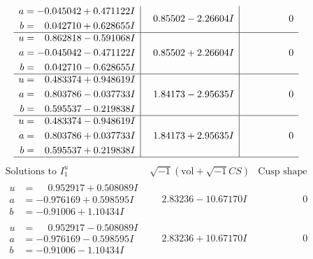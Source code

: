\documentclass[1p]{elsarticle_modified}
\theoremstyle{definition}
\newcommand{\I}{\sqrt{-1}}
\begin{document}
$$\begin{array}{c|c|c}
\begin{aligned}
a &= -0.045042 + 0.471122 I \\
b &= \phantom{-}0.042710 + 0.628655 I\end{aligned}
 & \phantom{-}0.85502 - 2.26604 I & \phantom{-0.000000 } 0 \\ \hline\begin{aligned}
u &= \phantom{-}0.862818 - 0.591068 I \\
a &= -0.045042 - 0.471122 I \\
b &= \phantom{-}0.042710 - 0.628655 I\end{aligned}
 & \phantom{-}0.85502 + 2.26604 I & \phantom{-0.000000 } 0 \\ \hline\begin{aligned}
u &= \phantom{-}0.483374 + 0.948619 I \\
a &= \phantom{-}0.803786 - 0.037733 I \\
b &= \phantom{-}0.595537 - 0.219838 I\end{aligned}
 & \phantom{-}1.84173 - 2.95635 I & \phantom{-0.000000 } 0 \\ \hline\begin{aligned}
u &= \phantom{-}0.483374 - 0.948619 I \\
a &= \phantom{-}0.803786 + 0.037733 I \\
b &= \phantom{-}0.595537 + 0.219838 I\end{aligned}
 & \phantom{-}1.84173 + 2.95635 I & \phantom{-0.000000 } 0\\
 \hline 
 \end{array}$$\newpage$$\begin{array}{c|c|c}  
\text{Solutions to }I^u_{1}& \I (\text{vol} + \sqrt{-1}CS) & \text{Cusp shape}\\
 \hline 
\begin{aligned}
u &= \phantom{-}0.952917 + 0.508089 I \\
a &= -0.976169 + 0.598595 I \\
b &= -0.91006 + 1.10434 I\end{aligned}
 & \phantom{-}2.83236 - 10.67170 I & \phantom{-0.000000 } 0 \\ \hline\begin{aligned}
u &= \phantom{-}0.952917 - 0.508089 I \\
a &= -0.976169 - 0.598595 I \\
b &= -0.91006 - 1.10434 I\end{aligned}
 & \phantom{-}2.83236 + 10.67170 I & \phantom{-0.000000 } 0 \\ \hline\begin{aligned}

\end{aligned}
\end{array}$$
\end{document}
